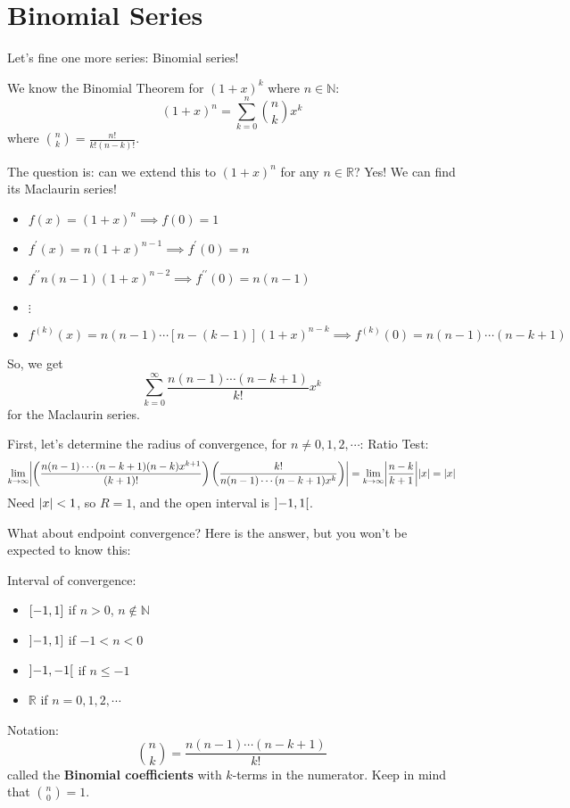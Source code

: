 \setcounter{section}{8}
\section{Binomial Series}
Let's fine one more series: Binomial series!

We know the Binomial Theorem for $ (1+x)^k $ where
$ n\in\mathbb{N} $:
\[ (1+x)^n=\sum\limits_{k=0}^{n} \binom{n}{k}x^k \]
where $ \displaystyle \binom{n}{k}=\frac{n!}{k!(n-k)!} $.

The question is: can we extend this to
$ (1+x)^n $ for any $ n\in\mathbb{R} $? Yes! We can find
its Maclaurin series!
\begin{itemize}
    \item $ f(x)=(1+x)^n\implies f(0)=1 $
    \item $ f^\prime(x)=n(1+x)^{n-1}\implies f^\prime(0)=n $
    \item $ f^{\prime\prime}n(n-1)(1+x)^{n-2}\implies f^{\prime\prime}(0)=n(n-1) $
    \item $ \vdots $
    \item $ f^{(k)}(x)=n(n-1)\cdots\left[ n-(k-1) \right](1+x)^{n-k}
              \implies f^{(k)}(0)=n(n-1)\cdots(n-k+1) $
\end{itemize}
So, we get
\[ \sum\limits_{k=0}^{\infty}\frac{n(n-1)\cdots(n-k+1)}{k!} x^k  \]
for the Maclaurin series.

First, let's determine the radius of convergence, for $ n\neq 0,1,2,\cdots $:
Ratio Test:
\[ \lim\limits_{{k} \to {\infty}}
    \abs*{\left( \frac{n(n-1)\cdots(n-k+1)(n-k)x^{k+1}}{(k+1)!}  \right)
    \left( \frac{k!}{n(n-1)\cdots(n-k+1)x^k}  \right)}
    =\lim\limits_{{k} \to {\infty}} \abs*{\frac{n-k}{k+1}}\abs{x}=\abs{x} \]
Need $ \lvert x\rvert<1 $, so $ R=1 $, and the open interval is
$ \interval[open]{-1}{1} $.

What about endpoint convergence? Here is the answer,
but you won't be expected to know this:

Interval of convergence:
\begin{itemize}
    \item $ \interval{-1}{1} $ if $ n>0 $, $ n\notin\mathbb{N} $
    \item $ \interval[open left]{-1}{1} $ if $ -1<n< 0$
    \item $ \interval[open]{-1}{-1} $ if $ n\leqslant -1 $
    \item $ \mathbb{R} $ if $ n=0,1,2,\cdots $
\end{itemize}
Notation:
\[ \binom{n}{k}=
    \frac{n(n-1)\cdots(n-k+1)}{k!} \]
called the \textbf{Binomial coefficients} with
$ k $-terms in the numerator. Keep in mind that $ \binom{n}{0}=1 $.

